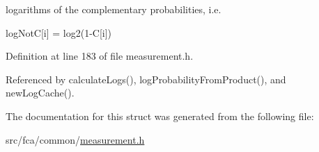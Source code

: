 logarithms of the complementary probabilities, i.\-e. 

log\-Not\-C\mbox{[}i\mbox{]} = log2(1-\/\-C\mbox{[}i\mbox{]}) 

\-Definition at line 183 of file measurement.\-h.



\-Referenced by calculate\-Logs(), log\-Probability\-From\-Product(), and new\-Log\-Cache().



\-The documentation for this struct was generated from the following file\-:\begin{DoxyCompactItemize}
\item 
src/fca/common/\hyperlink{common_2measurement_8h}{measurement.\-h}\end{DoxyCompactItemize}

